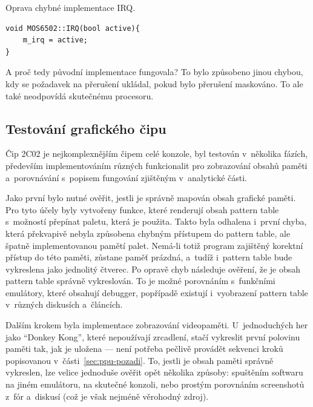 \begin{listing}[ht!]
	\caption{Oprava chybné implementace IRQ.}
	\label{list:6502-preruseni-irq-oprava}
	\begin{verbatim}
void MOS6502::IRQ(bool active){
	m_irq = active;
}
	\end{verbatim}
\end{listing}


\begin{note}
A proč tedy původní implementace fungovala? To bylo způsobeno jinou chybou, kdy se požadavek na přerušení ukládal, pokud bylo přerušení maskováno. To ale také neodpovídá skutečnému procesoru.
\end{note}

\subsection{Testování grafického čipu}
Čip 2C02 je nejkomplexnějším čipem celé konzole, byl testován v~několika fázích, především implementováním různých funkcionalit pro zobrazování obsahů paměti a~porovnávání s~popisem fungování zjištěným v~analytické části.

Jako první bylo nutné ověřit, jestli je správně mapován obsah grafické paměti. Pro tyto účely byly vytvořeny funkce, které renderují obsah pattern table s~možností přepínat paletu, která je použita. Takto byla odhalena i~první chyba, která překvapivě nebyla způsobena chybným přístupem do pattern table, ale špatně implementovanou pamětí palet. Nemá-li totiž program zajištěný korektní přístup do této paměti, zůstane paměť prázdná, a~tudíž i~pattern table bude vykreslena jako jednolitý čtverec. Po opravě chyb následuje ověření, že je obsah pattern table správně vykreslován. To je možné porovnáním s~funkčními emulátory, které obsahují debugger, popřípadě existují i~vyobrazení pattern table v~různých diskusích a~článcích.

Dalším krokem byla implementace zobrazování videopaměti. U~jednoduchých her jako \enquote{Donkey Kong}, které nepoužívají zrcadlení, stačí vykreslit první polovinu paměti tak, jak je uložena --- není potřeba pečlivě provádět sekvenci kroků popisovanou v~části~\ref{sec:ppu-pozadi}. To, jestli je obsah paměti správně vykreslen, lze velice jednoduše ověřit opět několika způsoby: spuštěním softwaru na jiném emulátoru, na skutečné konzoli, nebo prostým porovnáním screenshotů z~fór a~diskusí (což je však nejméně věrohodný zdroj).

